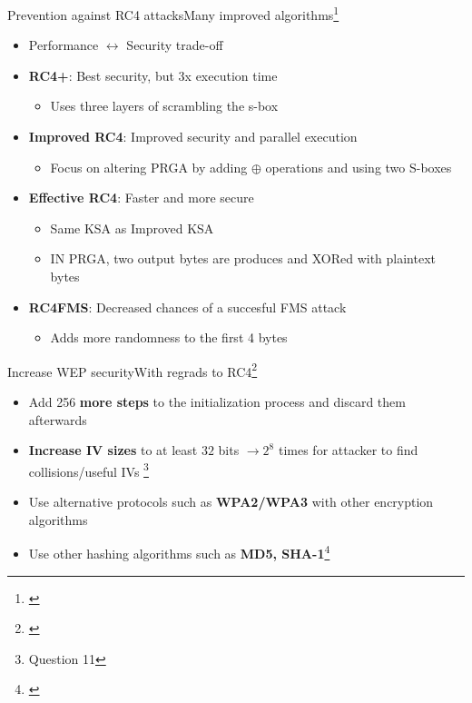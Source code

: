 \documentclass[
	aspectratio=169,	%
	onlytextwidth,		%
	t					%
	]{beamer}
\begin{document}
\begin{frame}[fragile]{Prevention against RC4 attacks}{Many improved algorithms\footnote[frame]{\cite{jindal2017optimization}}}
	\begin{itemize}[<+->]
		\item Performance $\leftrightarrow$ Security trade-off
		\item \textbf{RC4+}: Best security, but 3x execution time
		\begin{itemize}
			\item Uses three layers of scrambling the s-box 
		\end{itemize}
		\item \textbf{Improved RC4}: Improved security and parallel execution
		\begin{itemize}
			\item Focus on altering PRGA by adding $\oplus$ operations and using two S-boxes
		\end{itemize}
		\item \textbf{Effective RC4}: Faster and more secure
		\begin{itemize}
			\item Same KSA as Improved KSA 
			\item IN PRGA, two output bytes are produces and XORed with plaintext bytes
		\end{itemize}
		\item \textbf{RC4FMS}: Decreased chances of a succesful FMS attack
		\begin{itemize}
			\item Adds more randomness to the first 4 bytes 
		\end{itemize}
	\end{itemize}
\end{frame}

\begin{frame}[fragile]{Increase WEP security}{With regrads to RC4\footnote[frame]{\cite{wepcracking}}}
	\begin{itemize}[<+->]
		\item Add 256 \textbf{more steps} to the initialization process and discard them afterwards
		\item \textbf{Increase IV sizes} to at least $32$ bits $\rightarrow 2^{8}$ times for attacker to find collisions/useful IVs \footnote[frame]{\footnotesize Question 11}
		\item Use alternative protocols such as \textbf{WPA2/WPA3} with other encryption algorithms
		\item Use other hashing algorithms such as \textbf{MD5, SHA-1}\footnote[frame]{\cite{wepproblems}}
	\end{itemize}
\end{frame}
\end{document}
